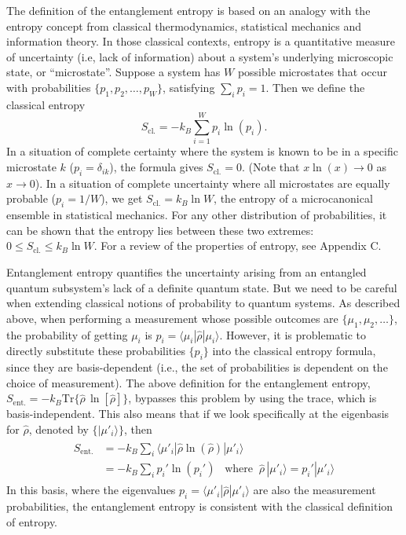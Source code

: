 \documentclass[pra,12pt]{revtex4}
\begin{document}
The definition of the entanglement entropy is based on an analogy with
the entropy concept from classical thermodynamics, statistical
mechanics and information theory.  In those classical contexts,
entropy is a quantitative measure of uncertainty (i.e, lack of
information) about a system's underlying microscopic state, or
``microstate''.  Suppose a system has $W$ possible microstates that
occur with probabilities $\{p_1, p_2, \dots, p_W\}$, satisfying
$\sum_i p_i = 1$.  Then we define the classical entropy
\begin{equation}
  S_{\mathrm{cl.}} = - k_B \sum_{i=1}^W p_i \ln(p_i).
\end{equation}
In a situation of complete certainty where the system is known to be
in a specific microstate $k$ ($p_i = \delta_{ik}$), the formula gives
$S_{\mathrm{cl.}} = 0$.  (Note that $x \ln(x)\rightarrow 0$ as
$x\rightarrow 0$).  In a situation of complete uncertainty where all
microstates are equally probable ($p_i = 1/W$), we get
$S_{\mathrm{cl.}} = k_B \ln W$, the entropy of a microcanonical
ensemble in statistical mechanics.  For any other distribution of
probabilities, it can be shown that the entropy lies between these two
extremes: $0 \le S_{\mathrm{cl.}}  \le k_B\ln W$.  For a review of the
properties of entropy, see Appendix C.

Entanglement entropy quantifies the uncertainty arising from an
entangled quantum subsystem's lack of a definite quantum state.  But
we need to be careful when extending classical notions of probability
to quantum systems.  As described above, when performing a measurement
whose possible outcomes are $\{\mu_1, \mu_2, \dots\}$, the probability
of getting $\mu_i$ is $p_i = \langle \mu_i | \hat{\rho}|\mu_i\rangle$.
However, it is problematic to directly substitute these probabilities
$\{p_i\}$ into the classical entropy formula, since they are
basis-dependent (i.e., the set of probabilities is dependent on the
choice of measurement).  The above definition for the entanglement
entropy, $S_{\mathrm{ent.}} = - k_B \mathrm{Tr} \big\{ \hat{\rho}\,
\ln[\hat{\rho}] \big\}$, bypasses this problem by using the trace,
which is basis-independent.  This also means that if we look
specifically at the eigenbasis for $\hat{\rho}$, denoted by
$\{|\mu'_i\rangle\}$, then
\begin{align}
  \begin{aligned}S_{\mathrm{ent.}} &= -k_B \sum_i \langle \mu'_i | \hat{\rho}\ln(\hat{\rho}) | \mu'_i\rangle  \\ &= - k_B \sum_i p_i' \ln(p_i') \;\;\;\mathrm{where}\;\;\hat{\rho}\,|\mu'_i\rangle = p_i' |\mu'_i\rangle\end{aligned}
\end{align}
In this basis, where the eigenvalues $p_i =
\langle\mu'_i|\hat{\rho}|\mu'_i\rangle$ are also the measurement
probabilities, the entanglement entropy is consistent with the
classical definition of entropy.
\end{document}

